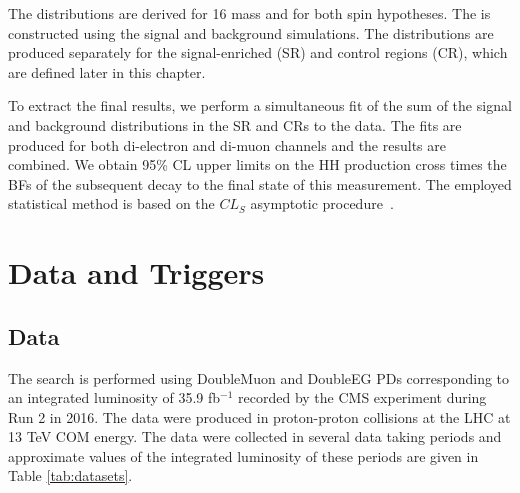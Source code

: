 \begin{small}
The \mTHH distributions are derived for 16 mass and for both spin hypotheses. The \mTHH is constructed using the signal and background simulations. The distributions are produced separately for the signal-enriched (SR) and control regions (CR), which are defined later in this chapter.

To extract the final results, we perform a simultaneous fit of the sum of the signal and background \mTHH distributions in the SR and CRs to the data. The fits are produced for both di-electron and di-muon channels and the results are combined. We obtain 95\% CL upper limits on the HH production cross times the BFs of the subsequent decay to the final state of this measurement. The employed statistical method is based on the $CL_{S}$ asymptotic procedure~\cite{Zech:1988un}.

\section{Data and Triggers}
\label{sec:data_and_triggers}

\subsection{Data}
The search is performed using DoubleMuon and DoubleEG PDs corresponding to an integrated luminosity of 35.9 fb$^{-1}$ recorded by the CMS experiment during Run 2 in 2016. The data were produced in proton-proton collisions at the LHC at 13 TeV COM energy. The data were collected in several data taking periods and approximate values of the integrated luminosity of these periods are given in Table \ref{tab:datasets}.


\end{small}
